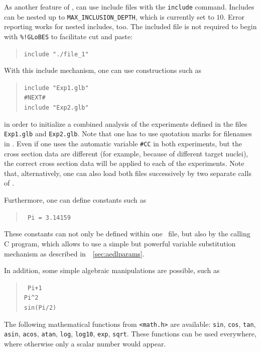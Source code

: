 As another feature of \AEDL , can use include files with the {\tt include} command. Includes can be nested up to {\tt MAX\_INCLUSION\_DEPTH}, which is currently set to $10$. Error reporting works 
 for nested includes, too. The included file is not required to begin 
 with {\tt \%!GLoBES} to facilitate cut and paste:
\begin{quote}
{\tt include "./file\_1"}
\end{quote}
With this include mechanism, one can use constructions such as 
\begin{quote}
{\tt    include  "Exp1.glb"\\
        \#NEXT\#\\
        include   "Exp2.glb"
}
\end{quote}
in order to initialize a combined analysis of the experiments defined in the files {\tt Exp1.glb} and {\tt Exp2.glb}. Note that one has 
to use quotation marks for filenames in \AEDL.
Even if one uses the
automatic variable {\tt \#CC} in both experiments, 
but the cross section data are different (for example, because of different target nuclei), the correct 
cross section data will be applied to each of the experiments. 
Note that, alternatively, one can 
also load both files successively by two separate calls of 
. 

Furthermore, one can define constants such as
\begin{quote}
{\tt
Pi = 3.14159
}
\end{quote}
These constants can not only be defined within one \AEDL\ file, but also
by the calling C program, which allows to use a simple but powerful variable
substitution mechanism as described in~\Sec~\ref{sec:aedlparams}.

In addition, some simple algebraic manipulations are possible, such as
\begin{quote}
{\tt
Pi+1\\
\verb+Pi^2+\\
sin(Pi/2)
}
\end{quote}
The following mathematical functions from {\tt <math.h>} are available: 
{\tt sin}, {\tt cos}, {\tt tan}, {\tt asin}, {\tt acos}, {\tt atan}, 
{\tt log}, {\tt log10}, {\tt exp}, {\tt sqrt}.
%
%
%
%
%
%
%
%
%
%
% 
These functions can be used everywhere, where
otherwise only a scalar number would appear. 


